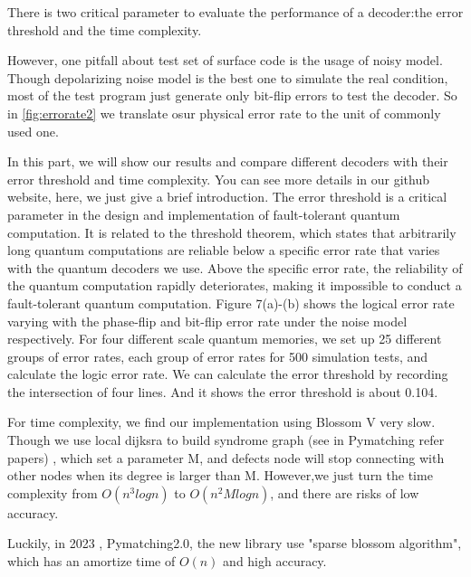 \documentclass[
    a4paper, %
    10pt, %
    unnumberedsections, %
    twoside, %
]{LTJournalArticle}
\begin{document}
There is two critical parameter to evaluate the performance of a decoder:the error threshold and the time complexity.


However, one pitfall about test set of surface code is the usage of noisy model.
Though depolarizing noise model is the best one to simulate the real condition, 
most of the test program just generate only bit-flip errors to test the decoder.
So in \ref{fig:errorate2} we translate osur physical error rate
to the unit of commonly used one.



    In this part, we will show our results and compare different decoders with their error threshold and time complexity. You can see more details in our github website, here, we just give a brief introduction.
    The error threshold is a critical parameter in the design and implementation of fault-tolerant quantum computation. It is related to the threshold theorem, which states that arbitrarily long quantum computations are reliable below a specific error rate that varies with the quantum decoders we use. Above the specific error rate, the reliability of the quantum computation rapidly deteriorates, making it impossible to conduct a fault-tolerant quantum computation.
    Figure 7(a)-(b) shows the logical error rate varying with the phase-flip and bit-flip error rate under the noise model respectively. For four different scale quantum memories, we set up 25 different groups of error rates, each group of error rates for 500 simulation tests, and calculate the logic error rate. We can calculate the error threshold by recording the intersection of four lines. And it shows the error threshold is about 0.104. 
    
    For time complexity, we find our implementation using Blossom V very slow.
    Though we use local dijksra to build syndrome graph (see in Pymatching refer papers) ,
    which set a parameter M, and defects node will stop connecting with other nodes when its degree is larger than M.
    However,we just turn the time complexity from $O(n^3logn)$ \cite{12} to $O(n^2Mlogn)$, and there are risks of low accuracy.

    Luckily, in 2023 , Pymatching2.0, the new library use "sparse blossom algorithm", which has an amortize time of $O(n)$ and high accuracy.
\end{document}

